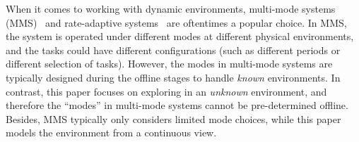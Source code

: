     When it comes to working with dynamic environments, multi-mode systems
	(MMS)~\cite{Huang2015TechniquesFS, Toma2018ImplementationAE} and rate-adaptive
	systems~\cite{Buttazzo2014RateadaptiveTM} are oftentimes a popular choice. In MMS, the system is
	operated under different modes at different physical environments, and the tasks could have different
	configurations (such as different periods or different selection of tasks). However, the modes in
	multi-mode systems are typically designed during the offline stages to handle \textit{known}
	environments. In contrast, this paper focuses on exploring in an \textit{unknown} environment, and
	therefore the ``modes'' in multi-mode systems cannot be pre-determined offline. Besides, MMS
	typically only considers limited mode choices, while this paper models the environment from a
	continuous view.


